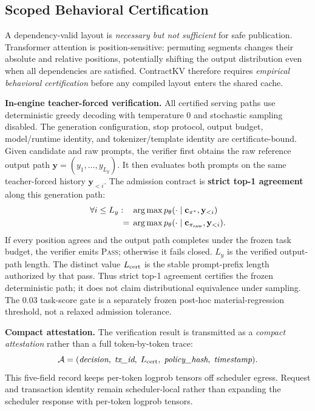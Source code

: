 \documentclass[journal]{IEEEtran}
\begin{document}
\subsection{Scoped Behavioral Certification}
\label{sec:certification}

A dependency-valid layout is \emph{necessary but not sufficient} for safe publication. Transformer attention is position-sensitive: permuting segments changes their absolute and relative positions, potentially shifting the output distribution even when all dependencies are satisfied. ContractKV therefore requires \emph{empirical behavioral certification} before any compiled layout enters the shared cache.

\smallskip
\noindent\textbf{In-engine teacher-forced verification.}
All certified serving paths use deterministic greedy decoding with temperature 0 and stochastic sampling disabled. The generation configuration, stop protocol, output budget, model/runtime identity, and tokenizer/template identity are certificate-bound. Given candidate and raw prompts, the verifier first obtains the raw reference output path $\mathbf{y}=(y_1,\ldots,y_{L_y})$. It then evaluates both prompts on the same teacher-forced history $\mathbf{y}_{<i}$. The admission contract is \textbf{strict top-1 agreement} along this generation path:
\begin{equation}
\begin{aligned}
  \forall i\le L_y:\quad
  &\arg\max p_\theta(\cdot\mid \mathbf{c}_{\pi^*},\mathbf{y}_{<i})\\
  ={}&\arg\max p_\theta(\cdot\mid \mathbf{c}_{\pi_{\rm raw}},\mathbf{y}_{<i}).
\end{aligned}
\end{equation}
If every position agrees and the output path completes under the frozen task budget, the verifier emits \textsc{Pass}; otherwise it fails closed. $L_y$ is the verified output-path length. The distinct value $L_{\rm cert}$ is the stable prompt-prefix length authorized by that pass. Thus strict top-1 agreement certifies the frozen deterministic path; it does not claim distributional equivalence under sampling. The 0.03 task-score gate is a separately frozen post-hoc material-regression threshold, not a relaxed admission tolerance.

\smallskip
\noindent\textbf{Compact attestation.}
The verification result is transmitted as a \emph{compact attestation} rather than a full token-by-token trace:
\begin{equation}
  \mathcal{A} = (\textit{decision},\; \textit{tx\_id},\; L_{\rm cert},\; \textit{policy\_hash},\; \textit{timestamp}).
\end{equation}
This five-field record keeps per-token logprob tensors off scheduler egress. Request and transaction identity remain scheduler-local rather than expanding the scheduler response with per-token logprob tensors.
\end{document}

